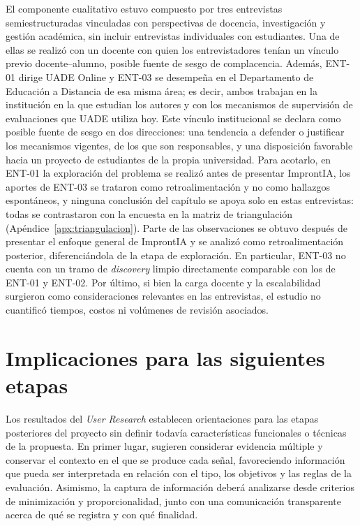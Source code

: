 El componente cualitativo estuvo compuesto por tres entrevistas semiestructuradas vinculadas con perspectivas de docencia, investigación y gestión académica, sin incluir entrevistas individuales con estudiantes. Una de ellas se realizó con un docente con quien los entrevistadores tenían un vínculo previo docente--alumno, posible fuente de sesgo de complacencia. Además, ENT-01 dirige UADE Online y ENT-03 se desempeña en el Departamento de Educación a Distancia de esa misma área; es decir, ambos trabajan en la institución en la que estudian los autores y con los mecanismos de supervisión de evaluaciones que UADE utiliza hoy. Este vínculo institucional se declara como posible fuente de sesgo en dos direcciones: una tendencia a defender o justificar los mecanismos vigentes, de los que son responsables, y una disposición favorable hacia un proyecto de estudiantes de la propia universidad. Para acotarlo, en ENT-01 la exploración del problema se realizó antes de presentar ImprontIA, los aportes de ENT-03 se trataron como retroalimentación y no como hallazgos espontáneos, y ninguna conclusión del capítulo se apoya solo en estas entrevistas: todas se contrastaron con la encuesta en la matriz de triangulación (Apéndice~\ref{apx:triangulacion}). Parte de las observaciones se obtuvo después de presentar el enfoque general de ImprontIA y se analizó como retroalimentación posterior, diferenciándola de la etapa de exploración. En particular, ENT-03 no cuenta con un tramo de \textit{discovery} limpio directamente comparable con los de ENT-01 y ENT-02. Por último, si bien la carga docente y la escalabilidad surgieron como consideraciones relevantes en las entrevistas, el estudio no cuantificó tiempos, costos ni volúmenes de revisión asociados.

\section{Implicaciones para las siguientes etapas}

Los resultados del \textit{User Research} establecen orientaciones para las etapas posteriores del proyecto sin definir todavía características funcionales o técnicas de la propuesta. En primer lugar, sugieren considerar evidencia múltiple y conservar el contexto en el que se produce cada señal, favoreciendo información que pueda ser interpretada en relación con el tipo, los objetivos y las reglas de la evaluación. Asimismo, la captura de información deberá analizarse desde criterios de minimización y proporcionalidad, junto con una comunicación transparente acerca de qué se registra y con qué finalidad.

